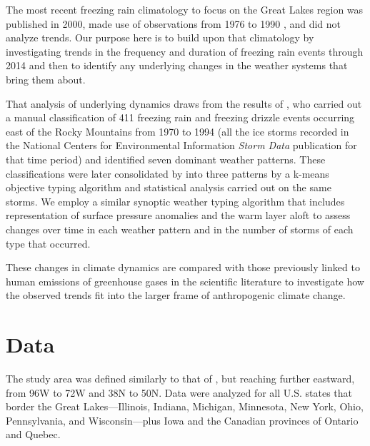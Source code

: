 \documentclass[twocol]{ametsoc}
\begin{document}
The most recent freezing rain climatology to focus on the Great Lakes region was published in 2000, made use of observations from 1976 to 1990 \citep{cortinas2000climatology}, and did not analyze trends. Our purpose here is to build upon that climatology by investigating trends in the frequency and duration of freezing rain events through 2014 and then to identify any underlying changes in the weather systems that bring them about. 

That analysis of underlying dynamics draws from the results of \citet{rauber2001synoptic}, who carried out a manual classification of 411 freezing rain and freezing drizzle events occurring east of the Rocky Mountains from 1970 to 1994 (all the ice storms recorded in the National Centers for Environmental Information \textit{Storm Data} publication for that time period) and identified seven dominant weather patterns. These classifications were later consolidated by \citet{erfani2012automated} into three patterns by a k-means objective typing algorithm and statistical analysis carried out on the same storms. We employ a similar synoptic weather typing algorithm that includes representation of surface pressure anomalies and the warm layer aloft to assess changes over time in each weather pattern and in the number of storms of each type that occurred.

These changes in climate dynamics are compared with those previously linked to human emissions of greenhouse gases in the scientific literature to investigate how the observed trends fit into the larger frame of anthropogenic climate change.


\section{Data}
The study area was defined similarly to that of \citet{cortinas2000climatology}, but reaching further eastward, from 96\degree W to 72\degree W and 38\degree N to 50\degree N. Data were analyzed for all U.S. states that border the Great Lakes---Illinois, Indiana, Michigan, Minnesota, New York, Ohio, Pennsylvania, and Wisconsin---plus Iowa and the Canadian provinces of Ontario and Quebec.
\end{document}
